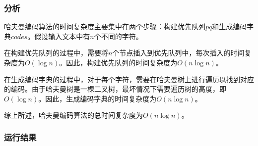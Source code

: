 \documentclass[lang=cn,11pt,a4paper]{elegantpaper}
\begin{document}
\subsubsection{分析}
哈夫曼编码算法的时间复杂度主要集中在两个步骤：构建优先队列$pq$和生成编码字典$codes$。假设输入文本中有$n$个不同的字符。

在构建优先队列的过程中，需要将$n$个节点插入到优先队列中，每次插入的时间复杂度为$O(\log n)$。因此，构建优先队列的时间复杂度为$O(n \log n)$。

在生成编码字典的过程中，对于每个字符，需要在哈夫曼树上进行遍历以找到对应的编码。由于哈夫曼树是一棵二叉树，最坏情况下需要遍历树的高度，即$O(\log n)$。因此，生成编码字典的时间复杂度为$O(n \log n)$。

综上所述，哈夫曼编码算法的总时间复杂度为$O(n \log n)$。

\subsubsection{运行结果}
\end{document}
